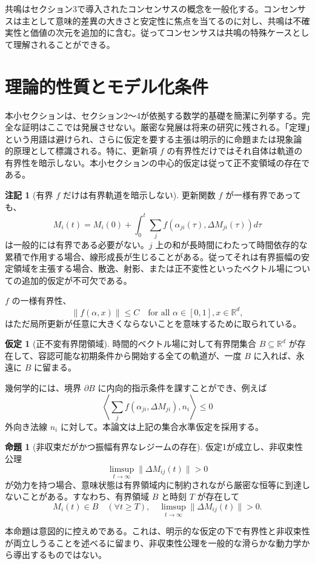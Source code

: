 \documentclass[11pt,a4paper]{article}
\theoremstyle{definition}
\newtheorem{proposition}{命題}[section]
\newtheorem{assumption}{仮定}[section]
\newtheorem{remark}{注記}[section]
\begin{document}
共鳴はセクション3で導入されたコンセンサスの概念を一般化する。コンセンサスは主として意味的差異の大きさと安定性に焦点を当てるのに対し、共鳴は不確実性と価値の次元を追加的に含む。従ってコンセンサスは共鳴の特殊ケースとして理解されることができる。

\section{理論的性質とモデル化条件}

本小セクションは、セクション2～4が依拠する数学的基礎を簡潔に列挙する。完全な証明はここでは発展させない。厳密な発展は将来の研究に残される。「定理」という用語は避けられ、さらに仮定を要する主張は明示的に命題または現象論的原理として標識される。特に、更新項 $f$ の有界性だけではそれ自体は軌道の有界性を暗示しない。本小セクションの中心的仮定は従って正不変領域の存在である。

\begin{remark}[有界 $f$ だけは有界軌道を暗示しない]
更新関数 $f$ が一様有界であっても、
\[
M_i(t) = M_i(0) + \int_0^t \sum_j f(\alpha_{ji}(\tau), \Delta M_{ji}(\tau)) d\tau
\]
は一般的には有界である必要がない。$j$ 上の和が長時間にわたって時間依存的な累積で作用する場合、線形成長が生じることがある。従ってそれは有界振幅の安定領域を主張する場合、散逸、射影、または正不変性といったベクトル場についての追加的仮定が不可欠である。

$f$ の一様有界性、
\[
\|f(\alpha, x)\| \leq C \quad \text{for all } \alpha \in [0,1], x \in \mathbb{R}^d,
\]
はただ局所更新が任意に大きくならないことを意味するために取られている。
\end{remark}

\begin{assumption}[正不変有界閉領域]
時間的ベクトル場に対して有界閉集合 $B \subseteq \mathbb{R}^d$ が存在して、容認可能な初期条件から開始する全ての軌道が、一度 $B$ に入れば、永遠に $B$ に留まる。

幾何学的には、境界 $\partial B$ に内向的指示条件を課すことができ、例えば
\[
\left\langle \sum_j f(\alpha_{ji}, \Delta M_{ji}), n_i \right\rangle \leq 0
\]
外向き法線 $n_i$ に対して。本論文は上記の集合水準仮定を採用する。
\end{assumption}

\begin{proposition}[非収束だがかつ振幅有界なレジームの存在]
仮定1が成立し、非収束性公理
\[
\limsup_{t \to \infty} \|\Delta M_{ij}(t)\| > 0
\]
が効力を持つ場合、意味状態は有界領域内に制約されながら厳密な恒等に到達しないことがある。すなわち、有界領域 $B$ と時刻 $T$ が存在して
\[
M_i(t) \in B \quad (\forall t \geq T), \quad \limsup_{t \to \infty} \|\Delta M_{ij}(t)\| > 0.
\]

本命題は意図的に控えめである。これは、明示的な仮定の下で有界性と非収束性が両立しうることを述べるに留まり、非収束性公理を一般的な滑らかな動力学から導出するものではない。
\end{proposition}
\end{document}
